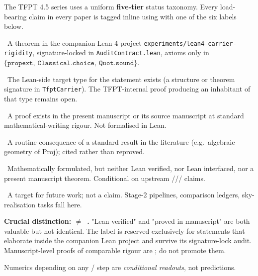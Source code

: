 \begin{tfptstatusbox}
The TFPT 4.5 series uses a uniform \textbf{five-tier} status
taxonomy. Every load-bearing claim in every paper is tagged
inline using \stag{$\cdot$} with one of the six labels below.

\begin{description}[leftmargin=2em, itemsep=2pt]
    \item[\stag{L} \,Lean verified.]\ A theorem in the companion
        Lean 4 project
        \texttt{experiments/lean4-carrier-rigidity},
        signature-locked in \texttt{AuditContract.lean}, axioms
        only in
        $\{\texttt{propext},\ \texttt{Classical.choice},\ \texttt{Quot.sound}\}$.
    \item[\stag{I} \,Lean interfaced.]\ The Lean-side target
        type for the statement exists (a structure or theorem
        signature in \texttt{TfptCarrier}). The TFPT-internal
        proof producing an inhabitant of that type remains open.
    \item[\stag{M} \,Manuscript theorem.]\ A proof exists in
        the present manuscript or its source manuscript at
        standard mathematical-writing rigour. Not formalised
        in Lean.
    \item[\stag{S} \,Standard-theorem interface.]\ A routine
        consequence of a standard result in the literature
        (e.g.\ algebraic geometry of $\mathrm{Proj}$); cited
        rather than reproved.
    \item[\stag{C} \,Conditional downstream proposal.]\
        Mathematically formulated, but neither Lean verified,
        nor Lean interfaced, nor a present manuscript theorem.
        Conditional on upstream
        /// claims.
    \item[\stag{P} \,Programmatic target.]\ A target for future
        work; not a claim. Stage-2 pipelines, comparison
        ledgers, sky-realisation tasks fall here.
\end{description}

\noindent
\textbf{Crucial distinction:  \boldmath$\neq$\unboldmath\ .}
"Lean verified" and "proved in manuscript" are both valuable
but not identical. The label  is reserved exclusively
for statements that elaborate inside the companion Lean project
and survive its signature-lock audit. Manuscript-level proofs
of comparable rigour are ; do not promote them.

\noindent
Numerics depending on any / step are
\emph{conditional readouts}, not predictions.
\end{tfptstatusbox}

